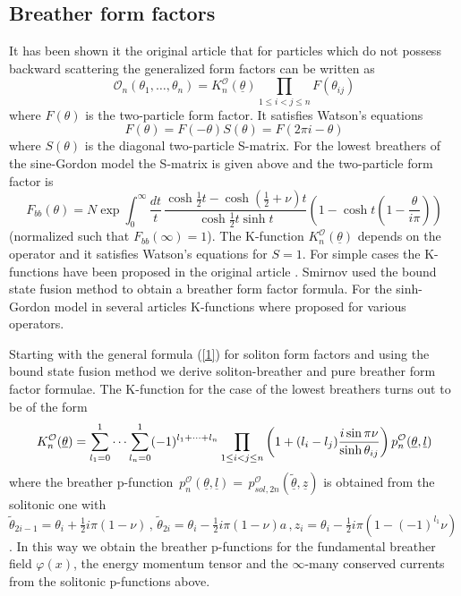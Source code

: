 \documentclass[a4paper,12pt]{article}
\begin{document}
\subsection*{Breather form factors}

It has been shown it the original article \cite{KW} that for particles which
do not possess backward scattering the generalized form factors can be
written as 
\begin{equation}
\mathcal{O}_{n}(\theta _{1},\dots ,\theta _{n})=K_{n}^{\mathcal{O}}(%
\underline{\theta })\prod_{1\leq i<j\leq n}F(\theta _{ij})  \label{2}
\end{equation}
where $F(\theta )$ is the two-particle form factor. It satisfies Watson's
equations 
\[
F(\theta )=F(-\theta )S(\theta )=F(2\pi i-\theta )
\]
where $S(\theta )$ is the diagonal two-particle S-matrix. For the lowest
breathers of the sine-Gordon model the S-matrix is given above and the
two-particle form factor is \cite{KW} 
\[
F_{bb}(\theta )=N\exp \int_{0}^{\infty }\frac{dt}{t}\,\frac{\cosh \frac{1}{2}%
t-\cosh (\frac{1}{2}+\nu )t}{\cosh \frac{1}{2}t\sinh t}\left( 1-\cosh
t\left( 1-\frac{\theta }{i\pi }\right) \right) 
\]
(normalized such that $F_{bb}(\infty )=1$). The K-function $K_{n}^{\mathcal{O%
}}(\underline{\theta })$ depends on the operator and it satisfies Watson's
equations for $S=1$. For simple cases the K-functions have been proposed in
the original article \cite{KW}. Smirnov \cite{Sm} used the bound state fusion
method to obtain a breather form factor formula. For the sinh-Gordon model
in several articles \cite{FMS,KM,MS,BL} K-functions where proposed for
various operators.

Starting with the general formula (\ref{1}) for soliton form factors and
using the bound state fusion method we derive \cite{BK} soliton-breather and
pure breather form factor formulae. The K-function for the case of the
lowest breathers turns out to be of the form 
\begin{equation}
K_{n}^{\mathcal{O}}(\underline{\theta })=\sum_{l_{1}=0}^{1}\dots
\sum_{l_{n}=0}^{1}(-1)^{l_{1}+\dots +l_{n}}\prod_{1\leq i<j\leq n}\left(
1+(l_{i}-l_{j})\frac{i\sin \pi \nu }{\sinh \theta _{ij}}\right) p_{n}^{%
\mathcal{O}}(\underline{\theta },\underline{l})  \label{3}
\end{equation}
where the breather p-function $\,p_{n}^{\mathcal{O}}(\underline{\theta },%
\underline{l})=\,p_{sol,2n}^{\mathcal{O}}(\underline{\tilde{\theta}},%
\underline{z})$ is obtained from the solitonic one with $\tilde{\theta}%
_{2i-1}=\theta _{i}+\tfrac{1}{2}i\pi (1-\nu )\,,\,\tilde{\theta}_{2i}=\theta
_{i}-\tfrac{1}{2}i\pi (1-\nu )a\,,z_{i}=\theta _{i}-\tfrac{1}{2}i\pi \left(
1-(-1)^{l_{1}}\nu \right) $. In this way we \cite{BK2} obtain the breather
p-functions for the {fundamental breather field} $\varphi (x)$, the {energy
momentum tensor} and {the $\infty $-many conserved currents} from the
solitonic p-functions above.
\end{document}
